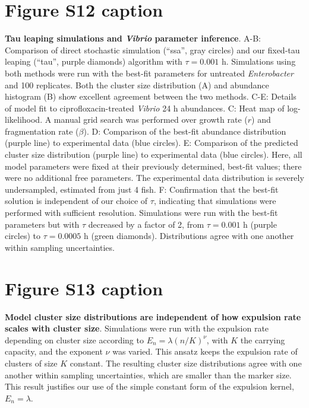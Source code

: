\documentclass[12pt]{article}
\begin{document}
\section*{Figure S12 caption}
\textbf{Tau leaping simulations and \textit{Vibrio} parameter inference}. A-B: Comparison of direct stochastic simulation (``ssa'', gray circles) and our fixed-tau leaping (``tau'', purple diamonds) algorithm with $\tau = 0.001$ h. Simulations using both methods were run with the best-fit parameters for untreated \textit{Enterobacter} and 100 replicates. Both the cluster size distribution (A) and abundance histogram (B) show excellent agreement between the two methods. C-E: Details of model fit to ciprofloxacin-treated \textit{Vibrio} 24 h abundances. C: Heat map of log-likelihood. A manual grid search was performed over growth rate ($r$) and fragmentation rate ($\beta$). D: Comparison of the best-fit abundance distribution (purple line) to experimental data (blue circles). E: Comparison of the predicted cluster size distribution (purple line) to experimental data (blue circles). Here, all model parameters were fixed at their previously determined, best-fit values; there were no additional free parameters. The experimental data distribution is severely undersampled, estimated from just 4 fish. F: Confirmation that the best-fit solution is independent of our choice of $\tau$, indicating that simulations were performed with sufficient resolution. Simulations were run with the best-fit parameters but with $\tau$ decreased by a factor of 2, from $\tau=0.001$ h (purple circles) to $\tau = 0.0005$ h (green diamonds). Distributions agree with one another within sampling uncertainties.

\section*{Figure S13 caption}
\textbf{Model cluster size distributions are independent of how expulsion rate scales with cluster size}. Simulations were run with the expulsion rate depending on cluster size according to $E_n = \lambda (n/K)^{\nu}$, with $K$ the carrying capacity, and the exponent $\nu$ was varied. This ansatz keeps the expulsion rate of clusters of size $K$ constant. The resulting cluster size distributions agree with one another within sampling uncertainties, which are smaller than the marker size. This result justifies our use of the simple constant form of the expulsion kernel, $E_n = \lambda$.

\newpage
\renewcommand{\figurename}{Supplementary Figure }
\end{document}
